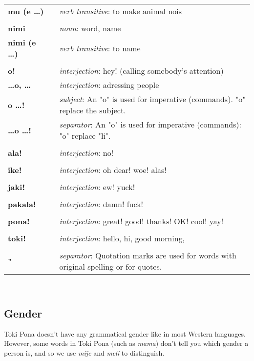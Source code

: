 \begin{supertabular}{p{2,5cm}|ll}
\textbf{mu (e \dots)} && \textit{verb transitive}: to make animal nois \\ %
 && \\ %
\textbf{nimi} && \textit{noun}: word, name \\ %
\textbf{nimi (e \dots )} && \textit{verb transitive}: to name \\ %
 && \\ %
\textbf{o!} && \textit{interjection}: hey! (calling somebody's attention) \\ %
\textbf{\dots o, \dots} && \textit{interjection}: adressing people \\ %
\textbf{o \dots !} && \textit{subject}: An "o" is used for imperative (commands). "o" replace the subject.  \\ %
\textbf{\dots o \dots !} && \textit{separator}: An "o" is used for imperative (commands): "o" replace "li". \\ %
 && \\ %
\textbf{ala!} && \textit{interjection}: no! \\ %
 && \\ %
\textbf{ike!} && \textit{interjection}: oh dear! woe! alas! \\ %
 && \\ %
\textbf{jaki!} && \textit{interjection}: ew! yuck! \\ %
 && \\ %
\textbf{pakala!} && \textit{interjection}: damn! fuck! \\ %
 && \\ %
\textbf{pona!} && \textit{interjection}: great! good! thanks! OK! cool! yay! \\ %
 && \\ %
\textbf{toki!} && \textit{interjection}: hello, hi, good morning, \\ %
 && \\ %
\textbf{"} && \textit{separator}: Quotation marks are used for words with original spelling or for quotes. \\ %
\end{supertabular} \\
%
\subsection*{Gender}
%
Toki Pona doesn't have any grammatical gender like in most Western languages.  
However, some words in Toki Pona (such as \textit{mama}) don't tell you which gender a person is, and so we use \textit{mije} and \textit{meli} to distinguish. 

